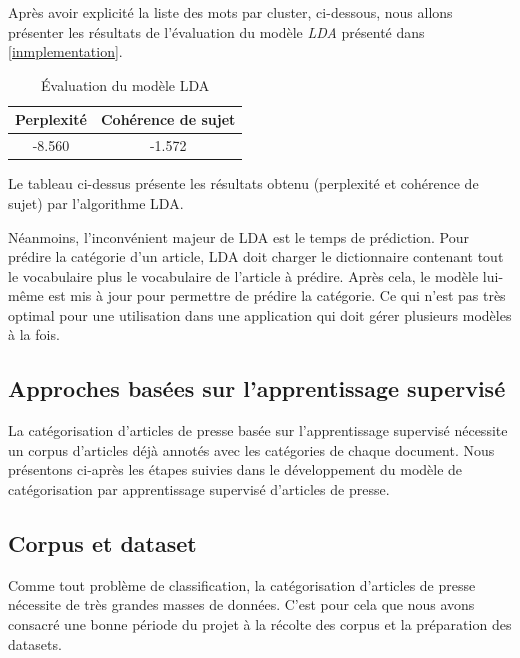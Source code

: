     Après avoir explicité la liste des mots par cluster, ci-dessous, nous allons présenter les résultats de l'évaluation du modèle \emph{LDA} présenté dans \ref{inmplementation}.
    \begin{table}[H]
        \begin{center}
            \begin{tabular}{|c|c|}
                \hline
                \textbf{Perplexité} & \textbf{Cohérence de sujet} \\
                \hline
                -8.560 &-1.572  \\
                \hline
            \end{tabular}
        \end{center}
        \caption{Évaluation du modèle LDA}
        \label{Eval LDA}
    \end{table}

    Le tableau ci-dessus présente les résultats obtenu (perplexité et cohérence de sujet) par l'algorithme LDA.

    Néanmoins, l'inconvénient majeur de LDA est le temps de prédiction. Pour prédire la catégorie d'un article, LDA doit charger le dictionnaire contenant tout le vocabulaire plus le vocabulaire de l'article à prédire. Après cela, le modèle lui-même est mis à jour pour permettre de prédire la catégorie. Ce qui n'est pas très optimal pour une utilisation dans une application qui doit gérer plusieurs modèles à la fois.


\subsection{Approches basées sur l'apprentissage supervisé}
La catégorisation d'articles de presse basée sur l'apprentissage supervisé nécessite un corpus d'articles déjà annotés avec les catégories de chaque document. Nous présentons ci-après les étapes suivies dans le développement du modèle de catégorisation par apprentissage supervisé d'articles de presse.

\subsection{Corpus et dataset}
Comme tout problème de classification, la catégorisation d'articles de presse nécessite de très grandes masses de données. C'est pour cela que nous avons  consacré une bonne période du projet à la récolte des corpus et la préparation des datasets.     

